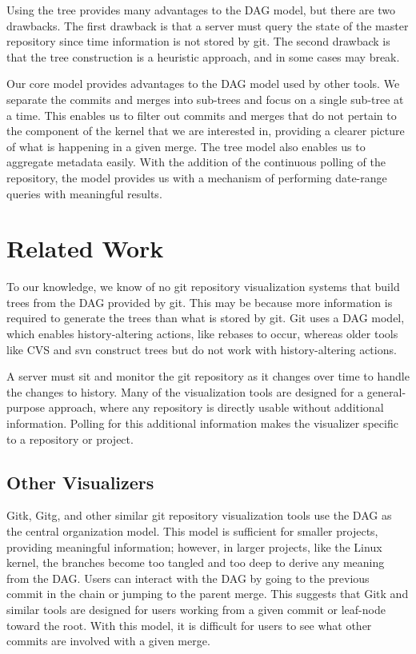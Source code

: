 \documentclass[conference, draftclsnofoot]{IEEEtran}
\begin{document}
Using the tree provides many advantages to the DAG model, but there are two
drawbacks. The first drawback is that a server must query the state of the master
repository since time information is not stored by git. The second drawback is that
the tree construction is a heuristic approach, and in some cases may break.

Our core model provides advantages to the DAG model used by other tools. We separate
the commits and merges into sub-trees and focus on a single sub-tree at a time. This
enables us to filter out commits and merges that do not pertain to the component of
the kernel that we are interested in, providing a clearer picture of what is
happening in a given merge. The tree model also enables us to aggregate metadata
easily. With the addition of the continuous polling of the repository, the model
provides us with a mechanism of performing date-range queries with meaningful
results.

\section{Related Work}

To our knowledge, we know of no git repository visualization systems that build
trees from the DAG provided by git. This may be because more information is required
to generate the trees than what is stored by git. Git uses a DAG model, which
enables history-altering actions, like rebases to occur, whereas older tools like
CVS and svn construct trees\cite{CVS2008} but do not work with history-altering
actions.

A server must sit and monitor the git repository as it changes over time to handle
the changes to history. Many of the visualization tools are designed for a
general-purpose approach, where any repository is directly usable without additional
information. Polling for this additional information makes the visualizer specific
to a repository or project.

\subsection{Other Visualizers}

Gitk, Gitg, and other similar git repository visualization tools use the DAG as the
central organization model. This model is sufficient for smaller projects, providing
meaningful information; however, in larger projects, like the Linux kernel, the
branches become too tangled and too deep to derive any meaning from the DAG. Users
can interact with the DAG by going to the previous commit in the chain or jumping to
the parent merge. This suggests that Gitk and similar tools are designed for users
working from a given commit or leaf-node toward the root. With this model, it is
difficult for users to see what other commits are involved with a given merge.
\end{document}
